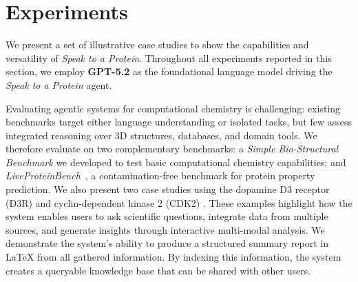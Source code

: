 \documentclass{article}
\begin{document}


\section{Experiments}\label{sec:cases}
We present a set of illustrative case studies to show the capabilities and versatility of \emph{Speak to a Protein}. Throughout all experiments reported in this section, we employ \textbf{GPT-5.2} as the foundational language model driving the \emph{Speak to a Protein} agent.

Evaluating agentic systems for computational chemistry is challenging: existing benchmarks target either language understanding or isolated tasks, but few assess integrated reasoning over 3D structures, databases, and domain tools. We therefore evaluate on two complementary benchmarks: a \emph{Simple Bio-Structural Benchmark} we developed to test basic computational chemistry capabilities; and \emph{LiveProteinBench}~\citep{liveproteinbench}, a contamination-free benchmark for protein property prediction.
We also present two case studies using the dopamine D3 receptor (D3R) \citep{Chien2010} and cyclin-dependent kinase 2 (CDK2) \citep{Malumbres2009}. These examples highlight how the system enables users to ask scientific questions, integrate data from multiple sources, and generate insights through interactive multi-modal analysis. We demonstrate the system's ability to produce a structured summary report in LaTeX from all gathered information. By indexing this information, the system creates a queryable knowledge base that can be shared with other users.
\end{document}
